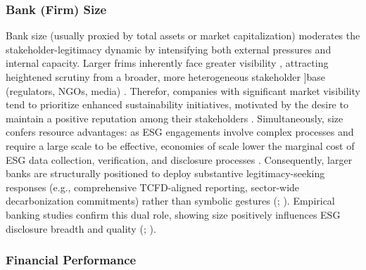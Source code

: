 \documentclass[
  authoryear]{elsarticle}
\begin{document}
\subsubsection{Bank (Firm) Size}\label{bank-firm-size}

Bank size (usually proxied by total assets or market capitalization)
moderates the stakeholder-legitimacy dynamic by intensifying both
external pressures and internal capacity. Larger frims inherently face
greater visibility \citep{MEZNAR1995}, attracting heightened scrutiny
from a broader, more heterogeneous stakeholder {]}base (regulators,
NGOs, media) \citep{PELOZA2006}. Therefor, companies with significant
market visibility tend to prioritize enhanced sustainability
initiatives, motivated by the desire to maintain a positive reputation
among their stakeholders \citep{DAMATO2020, ABDI2022}. Simultaneously,
size confers resource advantages: as ESG engagements involve complex
processes and require a large scale to be effective, economies of scale
lower the marginal cost of ESG data collection, verification, and
disclosure processes \citep{YOUN2015, FAVINO2019}. Consequently, larger
banks are structurally positioned to deploy substantive
legitimacy-seeking responses (e.g., comprehensive TCFD-aligned
reporting, sector-wide decarbonization commitments) rather than symbolic
gestures (\citet{DREMPETIC2020}; \citet{LAMANDA2024}). Empirical banking
studies confirm this dual role, showing size positively influences ESG
disclosure breadth and quality (\citet{BUALLAY2019};
\citet{ALAREENI2020}).

\subsubsection{Financial Performance}\label{financial-performance}
\end{document}
